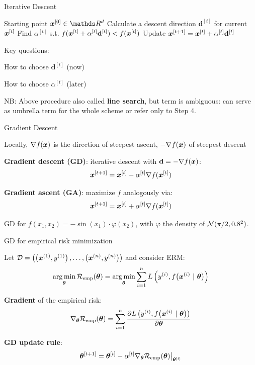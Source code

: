 \documentclass[11pt,compress,t,notes=noshow, xcolor=table]{beamer}
\begin{document}
\begin{framev}{Iterative Descent}
\begin{algorithm}[H]
\caption{Iterative Descent / Line search}
\begin{algorithmic}[1]
\State Starting point $\xv^{[0]} \in \R^d$
\State Calculate a descent direction $\mathbf{d}^{[t]}$ for current $\bm{x}^{[t]}$
\State Find $\alpha^{[t]}$ s.t. $f(\bm{x}^{[t]} + \alpha^{[t]} \mathbf{d}^{[t]}) < f(\bm{x}^{[t]})$
\State Update $\bm{x}^{[t + 1]} = \bm{x}^{[t]} + \alpha^{[t]} \mathbf{d}^{[t]}$
\EndWhile
\end{algorithmic}
\end{algorithm}
Key questions:
\begin{itemizeM}
\item How to choose $\mathbf{d}^{[t]}$ (now)
\item How to choose $\alpha^{[t]}$ (later)
\end{itemizeM}
\vfill
\begin{footnotesize}
NB: Above procedure also called \textbf{line search}, but term is ambiguous: can serve as umbrella term for the whole scheme or refer only to Step 4.
\end{footnotesize}
\end{framev}


\begin{framei}{Gradient Descent}
\item Locally, $\nabla f(\bm{x})$ is the direction of steepest ascent, $-\nabla f(\bm{x})$ of steepest descent
\item \textbf{Gradient descent (GD)}: iterative descent with $\mathbf{d} = -\nabla f(\bm{x})$:
$$\bm{x}^{[t+1]} = \bm{x}^{[t]} - \alpha^{[t]} \nabla f(\bm{x}^{[t]})$$
\item \textbf{Gradient ascent (GA)}: maximize $f$ analogously via:
$$\bm{x}^{[t+1]} = \bm{x}^{[t]} + \alpha^{[t]} \nabla f(\bm{x}^{[t]})$$
\begin{center}\begin{footnotesize}
GD for $f(x_1, x_2) = - \sin(x_1) \cdot \varphi(x_2)$, with $\varphi$ the density of $\mathcal{N}(\pi/2, 0.8^2)$.
\end{footnotesize}\end{center}
\end{framei}


\begin{framei}{GD for empirical risk minimization}
\item Let $\mathcal{D} = \left( \left(\bm{x}^{(1)}, y^{(1)}\right), \ldots, \left(\bm{x}^{(n)}, y^{(n)}\right)\right)$ and consider ERM:
$$\mathop{\mathrm{arg\,min}}_{\bm{\theta}} \mathcal{R}_{\text{emp}}(\bm{\theta}) = \mathop{\mathrm{arg\,min}}_{\bm{\theta}} \sum\limits_{i=1}^n L\left(y^{(i)}, f\big(\bm{x}^{(i)} ~|~ \bm{\theta}\big)\right)$$
\item \textbf{Gradient} of the empirical risk:
$$\nabla_{\bm{\theta}} \mathcal{R}_{\text{emp}}(\bm{\theta}) = \sum\limits_{i=1}^n \frac{\partial{L\left(y^{(i)}, f\big(\bm{x}^{(i)} ~|~ \bm{\theta}\big)\right)}}{\partial \bm{\theta}}$$
\item \textbf{GD update rule}:
$$\bm{\theta}^{[t+1]} = \bm{\theta}^{[t]} - \alpha^{[t]} \nabla_{\bm{\theta}} \mathcal{R}_{\text{emp}}(\bm{\theta})\big|_{\bm{\theta}^{[t]}}$$
\end{framei}
\end{document}
